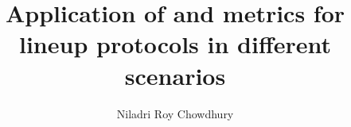 \title{Application of and metrics for lineup protocols in different scenarios}
\author{Niladri Roy Chowdhury}
\notice
\maketitle
